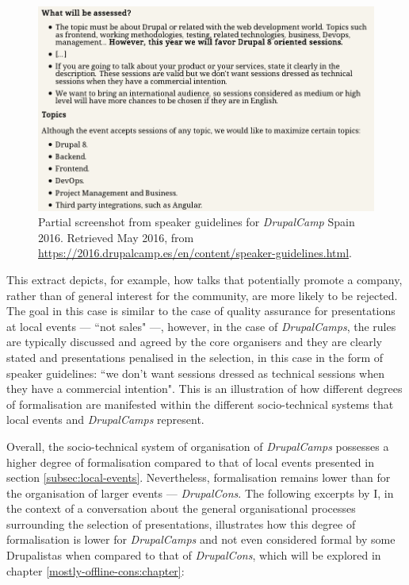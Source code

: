 \begin{figure}[H]
  \centering
\includegraphics[width=\textwidth]{img/quotes_replacement/speaker_guidelines_dcamp_spain_16.png}
\caption[Excerpt from the speaker guidelines for \textit{DrupalCamp} Spain 2016]{Partial screenshot from speaker guidelines for \textit{DrupalCamp} Spain 2016. Retrieved  May 2016, from \url{https://2016.drupalcamp.es/en/content/speaker-guidelines.html}.}
\label{quote_dcamp_guidelines}
\end{figure}

This extract depicts, for example, how talks that potentially promote a company, rather than of general interest for the community, are more likely to be rejected. The goal in this case is similar to the case of quality assurance for presentations at local events --- ``not sales" ---,  however, in the case of \textit{DrupalCamps}, the rules are typically discussed and agreed by the core organisers and they are clearly stated and presentations penalised in the selection, in this case in the form of speaker guidelines: ``we don't want sessions dressed as technical sessions when they have a commercial intention". This is an illustration of how different degrees of formalisation are manifested within the different socio-technical systems that local events and \textit{DrupalCamps} represent.

Overall, the socio-technical system of organisation of \textit{DrupalCamps} possesses a higher degree of formalisation compared to that of local events presented in section \ref{subsec:local-events}. Nevertheless, formalisation remains lower than for the organisation of larger events --- \textit{DrupalCons}. The following excerpts by I, in the context of a conversation about the general organisational processes surrounding the selection of presentations, illustrates how this degree of formalisation is lower for \textit{DrupalCamps} and not even considered formal by some Drupalistas when compared to that of \textit{DrupalCons}, which will be explored in chapter \ref{mostly-offline-cons:chapter}:

